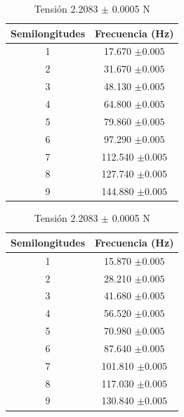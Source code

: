 \documentclass[10pt,a4paper]{article}
\begin{document}
\begin{table}[H]
    \centering
\begin{minipage}[t]{0.48\linewidth}\centering
\caption{Tensión 2.6797 $\pm$ 0.0005 N}
\label{tab:The parameters 2 }
\begin{tabular}{ c c }
\toprule
Semilongitudes &Frecuencia (Hz)      \\
\midrule

1 & 17.670 $\pm0.005$      \\
2& 31.670 $\pm0.005$     \\
3& 48.130 $\pm0.005$     \\
4& 64.800 $\pm0.005$     \\
5&79.860 $\pm0.005$     \\
6&97.290 $\pm0.005$     \\
7&112.540 $\pm0.005$     \\
8&127.740 $\pm0.005$     \\
9 & 144.880 $\pm0.005$ \\
\bottomrule
\end{tabular}
\end{minipage}\hfill%
\begin{minipage}[t]{0.48\linewidth}\centering
\caption{Tensión 2.2083 $\pm$ 0.0005 N}
\label{tab:The parameters 2 }
\begin{tabular}{ c c }
\toprule
Semilongitudes &Frecuencia (Hz)      \\
\midrule

1 & 15.870 $\pm0.005$      \\
2& 28.210 $\pm0.005$     \\
3& 41.680 $\pm0.005$     \\
4& 56.520 $\pm0.005$     \\
5& 70.980 $\pm0.005$     \\
6&87.640 $\pm0.005$     \\
7&101.810 $\pm0.005$     \\
8&117.030 $\pm0.005$     \\
9 & 130.840 $\pm0.005$ \\
\bottomrule
\end{tabular}
\end{minipage}
\end{table}
\end{document}
